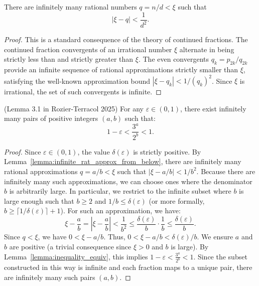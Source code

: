 \begin{lemma}\label{lemma:infinite_rat_approx_from_below}\leanok
There are infinitely many rational numbers $q = n/d < \xi$ such that
\begin{equation}
    |\xi - q| < \frac{1}{d^2}.
\end{equation}
\end{lemma}
\begin{proof}\leanok
This is a standard consequence of the theory of continued fractions. The continued fraction convergents of an irrational number $\xi$ alternate in being strictly less than and strictly greater than $\xi$. The even convergents $q_k = p_{2k}/q_{2k}$ provide an infinite sequence of rational approximations strictly smaller than $\xi$, satisfying the well-known approximation bound $|\xi - q_k| < 1 / (q_k)^2$. Since $\xi$ is irrational, the set of such convergents is infinite.
\end{proof}

\begin{theorem}\label{theorem:exists_infinite_pairs_approx}\leanok
(Lemma 3.1 in Rozier-Terracol 2025) For any $\varepsilon \in (0, 1)$, there exist infinitely many
pairs of positive integers $(a, b)$ such that:
\begin{equation}
    1 - \varepsilon < \frac{3^a}{2^b} < 1.
\end{equation}
\end{theorem}
\begin{proof}\leanok
Since $\varepsilon \in (0, 1)$, the value $\delta(\varepsilon)$ is strictly positive. By Lemma~\ref{lemma:infinite_rat_approx_from_below}, there are infinitely many rational approximations $q = a/b < \xi$ such that $|\xi - a/b| < 1/b^2$. Because there are infinitely many such approximations, we can choose ones where the denominator $b$ is arbitrarily large. In particular, we restrict to the infinite subset where $b$ is large enough such that $b \ge 2$ and $1/b \le \delta(\varepsilon)$ (or more formally, $b \ge \lceil 1 / \delta(\varepsilon) \rceil + 1$).
For such an approximation, we have:
\[
    \xi - \frac{a}{b} = \left|\xi - \frac{a}{b}\right| < \frac{1}{b^2} \le \frac{\delta(\varepsilon)}{b} \cdot \frac{1}{b} \le \frac{\delta(\varepsilon)}{b}.
\]
Since $q < \xi$, we have $0 < \xi - a/b$. Thus, $0 < \xi - a/b < \delta(\varepsilon)/b$.
We ensure $a$ and $b$ are positive (a trivial consequence since $\xi > 0$ and $b$ is large).
By Lemma~\ref{lemma:inequality_equiv}, this implies $1 - \varepsilon < \frac{3^a}{2^b} < 1$.
Since the subset constructed in this way is infinite and each fraction maps to a unique pair, there are infinitely many such pairs $(a, b)$.
\end{proof}

